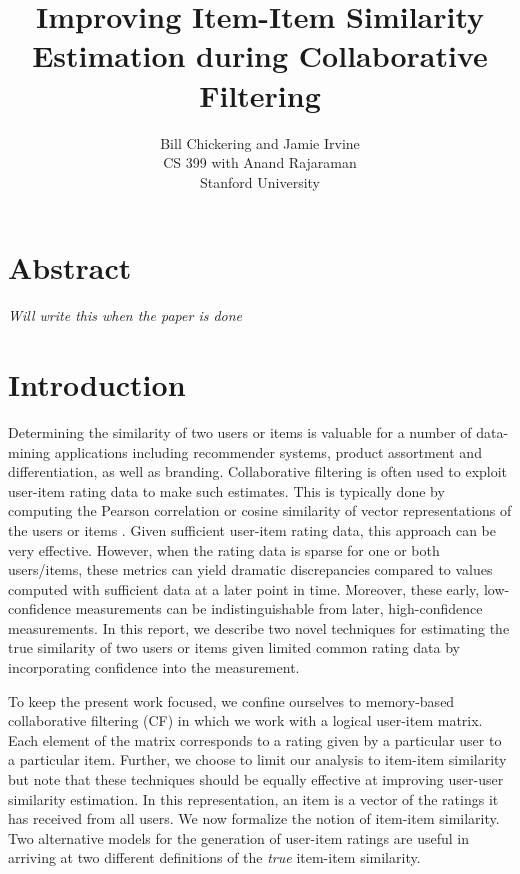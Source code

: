 \documentclass[11pt]{article}
\begin{document}

\title{Improving Item-Item Similarity Estimation during Collaborative Filtering}
\author{Bill Chickering and Jamie Irvine\\
CS 399 with Anand Rajaraman\\
Stanford University}
\renewcommand{\today}{March 25, 2014}
\maketitle

\section*{Abstract}
\emph{Will write this when the paper is done}

\section*{Introduction}
Determining the similarity of two users or items is valuable for a number of
data-mining applications including recommender systems, product assortment and
differentiation, as well as branding. Collaborative filtering is often used to
exploit user-item rating data to make such estimates. This is typically done by
computing the Pearson correlation or cosine similarity of vector representations
of the users or items \cite{Su2009}. Given sufficient user-item rating data,
this approach can be very effective. However, when the rating data is sparse for
one or both users/items, these metrics can yield dramatic discrepancies compared
to values computed with sufficient data at a later point in time. Moreover,
these early, low-confidence measurements can be indistinguishable from later,
high-confidence measurements.  In this report, we describe two novel techniques
for estimating the true similarity of two users or items given limited common
rating data by incorporating confidence into the measurement.

To keep the present work focused, we confine ourselves to memory-based
collaborative filtering (CF) in which we work with a logical user-item matrix.
Each element of the matrix corresponds to a rating given by a particular user to
a particular item. Further, we choose to limit our analysis to item-item
similarity but note that these techniques should be equally effective at
improving user-user similarity estimation. In this representation, an item is a
vector of the ratings it has received from all users. We now formalize the
notion of item-item similarity. Two alternative models for the generation of
user-item ratings are useful in arriving at two different definitions of the
{\em true} item-item similarity.
\end{document}
